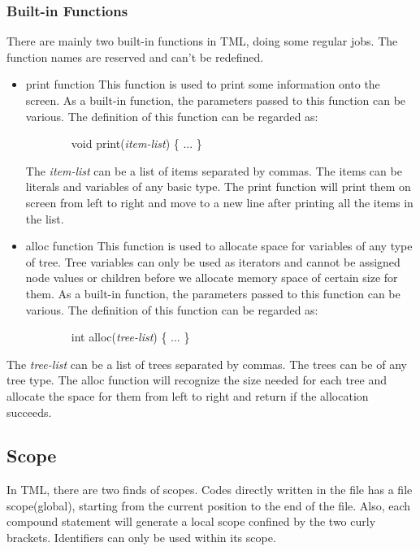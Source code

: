 \documentclass[12pt,psfig,a4]{article}
\begin{document}
\subsubsection{Built-in Functions}
There are mainly two built-in functions in TML, doing some regular jobs. The function names are reserved and can't be redefined.

\begin{itemize}
\item print function
This function is used to print some information onto the screen.
As a built-in function, the parameters passed to this function can be various. The definition of this function can be regarded as:
\begin{code}
\begin{tabbing}
~~~~~~~~void print(\textsl{item-list}) \{ ... \}
\end{tabbing}
\end{code}

The \textsl{item-list} can be a list of items separated by commas. The items can be literals and variables of any basic type. The print function will print them on screen from left to right and move to a new line after printing all the items in the list.

\item alloc function
This function is used to allocate space for variables of any type of tree.
Tree variables can only be used as iterators and cannot be assigned node values or children before we allocate memory space of certain size for them.
As a built-in function, the parameters passed to this function can be various. The definition of this function can be regarded as:
\begin{code}
\begin{tabbing}
~~~~~~~~int alloc(\textsl{tree-list}) \{ ... \}
\end{tabbing}
\end{code}

\end{itemize}

The \textsl{tree-list} can be a list of trees separated by commas. The trees can be of any tree type. The alloc function will recognize the size needed for each tree and allocate the space for them from left to right and return if the allocation succeeds.

\subsection{Scope}
In TML, there are two finds of scopes. Codes directly written in the file has a file scope(global), starting from the current position to the end of the file. Also, each compound statement will generate a local scope confined by the two curly brackets. Identifiers can only be used within its scope.
\end{document}
